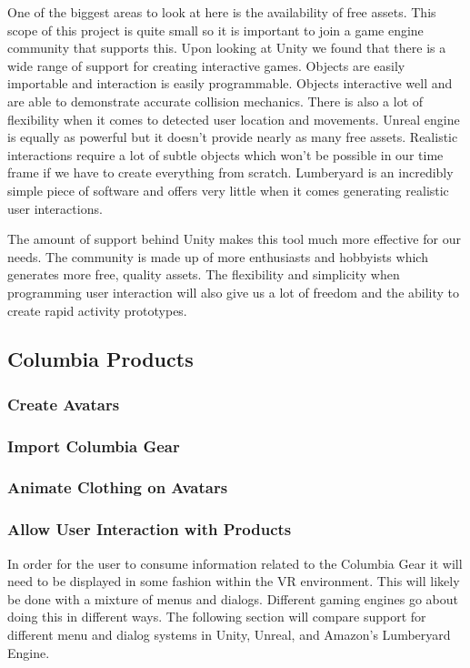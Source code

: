 \documentclass[10pt,journal,compsoc,onecolumn, draftclsnofoot]{IEEEtran}
\begin{document}
One of the biggest areas to look at here is the availability of free assets.
This scope of this project is quite small so it is important to join a game engine community that supports this.
Upon looking at Unity we found that there is a wide range of support for creating interactive games.
Objects are easily importable and interaction is easily programmable.
Objects interactive well and are able to demonstrate accurate collision mechanics.
There is also a lot of flexibility when it comes to detected user location and movements.
Unreal engine is equally as powerful but it doesn’t provide nearly as many free assets.
Realistic interactions require a lot of subtle objects which won’t be possible in our time frame if we have to create everything from scratch.
Lumberyard is an incredibly simple piece of software and offers very little when it comes generating realistic user interactions.

The amount of support behind Unity makes this tool much more effective for our needs.
The community is made up of more enthusiasts and hobbyists which generates more free, quality assets.
The flexibility and simplicity when programming user interaction will also give us a lot of freedom and the ability to create rapid activity prototypes.
\vspace{2mm}


\subsection{Columbia Products}
\subsubsection{Create Avatars}

\subsubsection{Import Columbia Gear}

\subsubsection{Animate Clothing on Avatars}

\subsubsection{Allow User Interaction with Products}
In order for the user to consume information related to the Columbia Gear it will need to be displayed in some fashion within the VR environment.
This will likely be done with a mixture of menus and dialogs.
Different gaming engines go about doing this in different ways.
The following section will compare support for different menu and dialog systems in Unity, Unreal, and Amazon's Lumberyard Engine.
\end{document}
